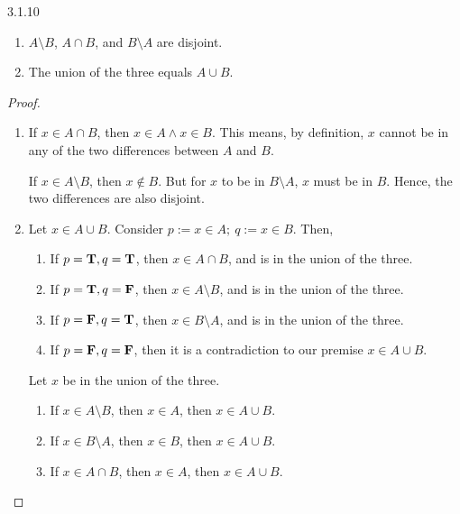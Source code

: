 \begin{exercise}{3.1.10}
	\begin{enumerate}
		\item $A\setminus B$, $A\cap B$, and $B \setminus A$ are disjoint.
		\item The union of the three equals $A \cup B$.
	\end{enumerate}
\end{exercise}
\begin{proof}\leavevmode
	\begin{enumerate}
		\item If $x \in A \cap B$, then $x \in A \wedge x \in B$. This means, by definition, $x$ cannot be in any of the two differences between $A$ and $B$.
		
		If $x \in A \setminus B$, then $x \notin B$. But for $x$ to be in $B \setminus A$, $x$ must be in $B$. Hence, the two differences are also disjoint.
		
		\item Let $x \in A \cup B$. Consider $p := x \in A;\ q := x \in B$. Then,
		\begin{enumerate}
			\item If $p = \mathbf{T}, q = \mathbf{T}$, then $x \in A \cap B$, and is in the union of the three.
			\item If $p = \mathbf{T}, q = \mathbf{F}$, then $x \in A \setminus B$, and is in the union of the three.
			\item If $p = \mathbf{F}, q = \mathbf{T}$, then $x \in B \setminus A$, and is in the union of the three.
			\item If $p = \mathbf{F}, q = \mathbf{F}$, then it is a contradiction to our premise $x \in A \cup B$.
		\end{enumerate}
	
		Let $x$ be in the union of the three.
		\begin{enumerate}
			\item If $x \in A \setminus B$, then $x \in A$, then $x \in A \cup B$.
			\item If $x \in B \setminus A$, then $x \in B$, then $x \in A \cup B$.
			\item If $x \in A \cap B$, then $x \in A$, then $x \in A \cup B$.
		\end{enumerate}
	\end{enumerate}
\end{proof}

